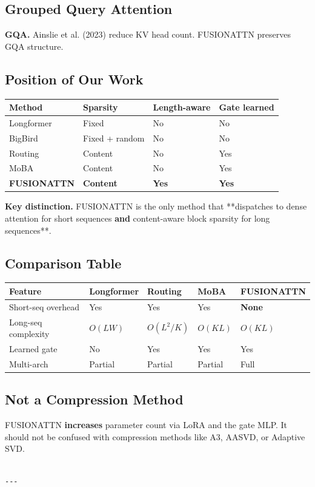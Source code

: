 \subsection{Grouped Query Attention}

\textbf{GQA.} Ainslie et al. (2023) reduce KV head count. FUSIONATTN preserves 
GQA structure.

\subsection{Position of Our Work}

\begin{table}[H]
\centering
\small
\begin{tabular}{llll}
\toprule
\textbf{Method} & \textbf{Sparsity} & \textbf{Length-aware} & \textbf{Gate learned} \\
\midrule
Longformer & Fixed & No & No \\
BigBird & Fixed + random & No & No \\
Routing & Content & No & Yes \\
MoBA & Content & No & Yes \\
\textbf{FUSIONATTN} & \textbf{Content} & \textbf{Yes} & \textbf{Yes} \\
\bottomrule
\end{tabular}
\end{table}

\textbf{Key distinction.} FUSIONATTN is the only method that **dispatches to 
dense attention for short sequences\textbf{ and }content-aware block sparsity 
for long sequences**.

\subsection{Comparison Table}

\begin{table}[H]
\centering
\small
\begin{tabular}{lllll}
\toprule
\textbf{Feature} & \textbf{Longformer} & \textbf{Routing} & \textbf{MoBA} & \textbf{FUSIONATTN} \\
\midrule
Short-seq overhead & Yes & Yes & Yes & \textbf{None} \\
Long-seq complexity & $O(LW)$ & $O(L^2/K)$ & $O(KL)$ & $O(KL)$ \\
Learned gate & No & Yes & Yes & Yes \\
Multi-arch & Partial & Partial & Partial & Full \\
\bottomrule
\end{tabular}
\end{table}

\subsection{Not a Compression Method}

FUSIONATTN \textbf{increases} parameter count via LoRA and the gate MLP. It 
should not be confused with compression methods like A3, AASVD, or 
Adaptive SVD.
\begin{lstlisting}

---
\end{lstlisting}